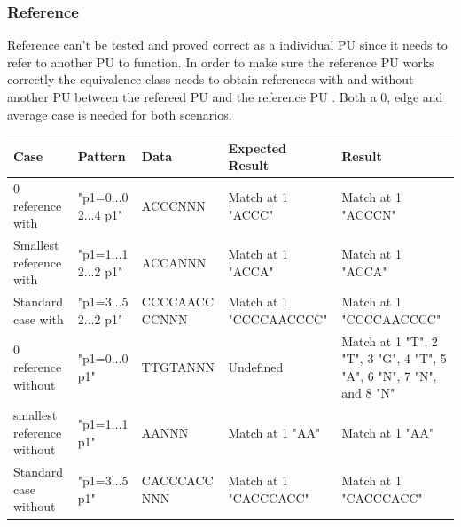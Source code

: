 \documentclass[12pt]{article}
\newcommand{\pu}{PU }
\begin{document}
\subsubsection{Reference}
Reference can't be tested and proved correct as a individual \pu since it needs to refer to another \pu
to function. 
In order to make sure the reference \pu works correctly the equivalence class needs to obtain references with and
without another \pu between the refereed \pu and the reference \pu. Both a 0, edge and average case is needed for both
scenarios.
\begin{table}[H]
\begin{tabular}{p{4cm}|p{3cm}|p{2.5cm}|p{2.5cm}|p{2.5cm}}
Case 			& Pattern & Data & Expected Result & Result \\ \hline
\rowcolor{lightred}
0 reference with 	& "p1=0...0 2...4 p1" & ACCCNNN & Match at 1 "ACCC" & Match at 1 "ACCCN" \\ \hline
\rowcolor{lightgreen}
Smallest reference with 	& "p1=1...1 2...2 p1" & ACCANNN & Match at 1 "ACCA" & Match at 1 "ACCA" \\ \hline
\rowcolor{lightgreen}
Standard case with	& "p1=3...5 2...2 p1" & CCCCAACC CCNNN & Match at 1 "CCCCAACCCC" & Match at 1 "CCCCAACCCC"\\ \hline
\rowcolor{lightred}
0 reference without	& "p1=0...0 p1" & TTGTANNN & Undefined & Match at 1 "T", 2 "T", 3 "G", 4 "T", 5 "A", 6 "N", 7 "N", and 8 "N"\\ \hline
\rowcolor{lightgreen}
smallest reference without & "p1=1...1 p1" & AANNN & Match at 1 "AA" & Match at 1 "AA" \\ \hline
\rowcolor{lightgreen}
Standard case without & "p1=3...5 p1" & CACCCACC NNN & Match at 1 "CACCCACC" & Match at 1 "CACCCACC" \\ \hline
\end{tabular}
\end{table}
\end{document}
